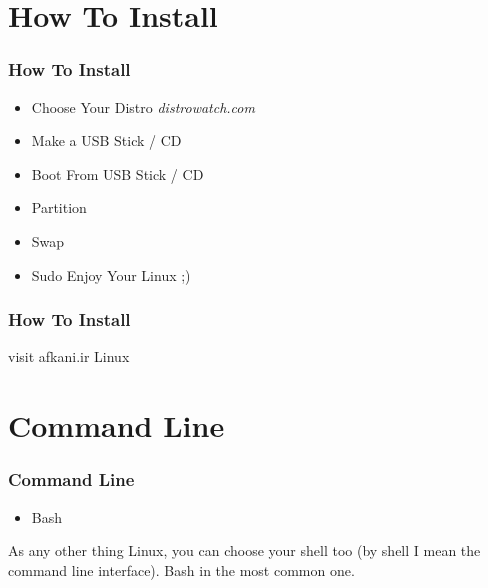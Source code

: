 \documentclass{beamer}
\begin{document}

\section{How To Install}
\begin{frame}
\frametitle{How To Install}
\begin{itemize}
\item Choose Your Distro \emph {distrowatch.com}
\item Make a USB Stick / CD
\item Boot From USB Stick / CD
\item Partition
\item Swap
\item Sudo Enjoy Your Linux ;)
\end{itemize}


\end{frame}

\begin{frame}
\frametitle{How To Install}
\Huge visit afkani.ir \triangleright Linux
\end{frame}

\section{Command Line}
\begin{frame}
\frametitle{Command Line}
\begin{itemize}
\item Bash
\end{itemize}
As any other thing Linux, you can choose your shell too (by shell I mean the command line interface). Bash in the most common one.


\end{frame}

\end{document}
